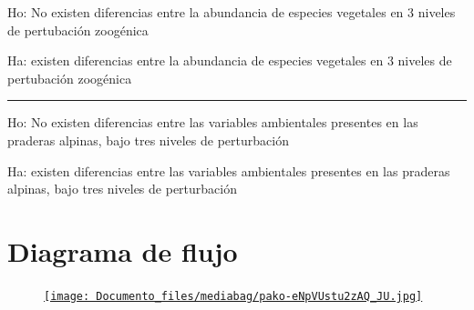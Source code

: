 \documentclass[
  letterpaper,
  DIV=11,
  numbers=noendperiod]{scrartcl}
\begin{document}
\begin{tcolorbox}[enhanced jigsaw, left=2mm, toprule=.15mm, leftrule=.75mm, coltitle=black, title=\textcolor{quarto-callout-tip-color}{\faLightbulb}\hspace{0.5em}{Hipótesis}, colbacktitle=quarto-callout-tip-color!10!white, breakable, colframe=quarto-callout-tip-color-frame, opacityback=0, toptitle=1mm, titlerule=0mm, opacitybacktitle=0.6, arc=.35mm, rightrule=.15mm, bottomrule=.15mm, bottomtitle=1mm, colback=white]

Ho: No existen diferencias entre la abundancia de especies vegetales en
3 niveles de pertubación zoogénica

Ha: existen diferencias entre la abundancia de especies vegetales en 3
niveles de pertubación zoogénica

\begin{center}\rule{0.5\linewidth}{0.5pt}\end{center}

Ho: No existen diferencias entre las variables ambientales presentes en
las praderas alpinas, bajo tres niveles de perturbación

Ha: existen diferencias entre las variables ambientales presentes en las
praderas alpinas, bajo tres niveles de perturbación

\end{tcolorbox}

\hypertarget{diagrama-de-flujo}{%
\section{Diagrama de flujo}\label{diagrama-de-flujo}}

\begin{figure}

{\centering 

\href{https://mermaid.live/edit\#pako:eNpVUstu2zAQ_JUFTwkgG5ZkRaoOOdhy2kORAnWRQy0fVtJaZiGRAkmlcRx_VT4hP9albRStDnzMzswuBzqKWjckcrHr9O96j8bBj6JUwF9TbW4KdGjJ5RfkiVpyWMuPdwXYDVLh7RYupcXmCY3EqiObQwLYV5KUQ77CATJoCAzaVtsrfTeqWmrl6xfgW2XJPKMHvUOawDAqx3xW9iNZZ0hftQ9YO21yeJTP1Pn6QMaN1XWuRx3AWvcUwBfZ7relaqrJ5B4WLF6AP72t6Q2Wm5WtdSvJaAUdWrDDwIyab1iNqkEej9H7aLb9T1ds1gS_eLKP978yLyqVH-USFrekfwNgh5WXGcJOvqLvuJPtyHkAvQydNsjP4W7MK7jRqlTLy7Y6t611r98eNkttDHW6Ndijf4v2Uu5VkLKywYYhNFdIWo7E-ji2MJmyyeebr7IyaA7g3XgxZ2oAbev3KIDvUPHst6USgejJ9Cgb_imOPvFSuD31VIqcjw3tcOxcKUp1YiqOTq8Pqha5MyMFYhw4BCok-jlFvsPOMjqgEvlRvIg8nGfTNA5nd1E6j7NwPs8CcRD55C6efsqyMJ3NwzRJszQ-BeJVa7aIpmESRdEsDGdZGCdxmJz9fp6LZ__TH4WN7Kk}{\texttt{[image: Documento\_files/mediabag/pako-eNpVUstu2zAQ\_JU.jpg]}}

}

\end{figure}
\end{document}
